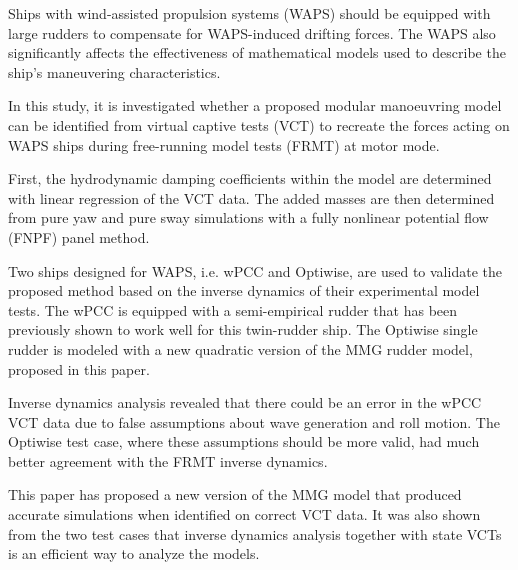 Ships with wind-assisted propulsion systems (WAPS) should be equipped with large rudders to compensate for WAPS-induced drifting forces. The WAPS also significantly affects the effectiveness of mathematical models used to describe the ship's maneuvering characteristics.

In this study, it is investigated whether a proposed modular manoeuvring model can be identified from virtual captive tests (VCT) to recreate the forces acting on WAPS ships during free-running model tests (FRMT) at motor mode. 

First, the hydrodynamic damping coefficients within the model are determined with linear regression of the VCT data. The added masses are then determined from pure yaw and pure sway simulations with a fully
nonlinear potential flow (FNPF) panel method.

Two ships designed for WAPS, i.e. wPCC and Optiwise, are used to validate the proposed method based on the inverse dynamics of their experimental model tests. The wPCC is equipped with a semi-empirical rudder that has been previously shown to work well for this twin-rudder ship. The Optiwise single rudder is modeled with a new quadratic version of the MMG rudder model, proposed in this paper. 

Inverse dynamics analysis revealed that there could be an error in the wPCC VCT data due to false assumptions about wave generation and roll motion. The Optiwise test case, where these assumptions should be more valid, had much better agreement with the FRMT inverse dynamics. 

This paper has proposed a new version of the MMG model that produced accurate simulations when identified on correct VCT data. It was also shown from the two test cases that inverse dynamics analysis together with state VCTs is an efficient way to analyze the models.

%    

